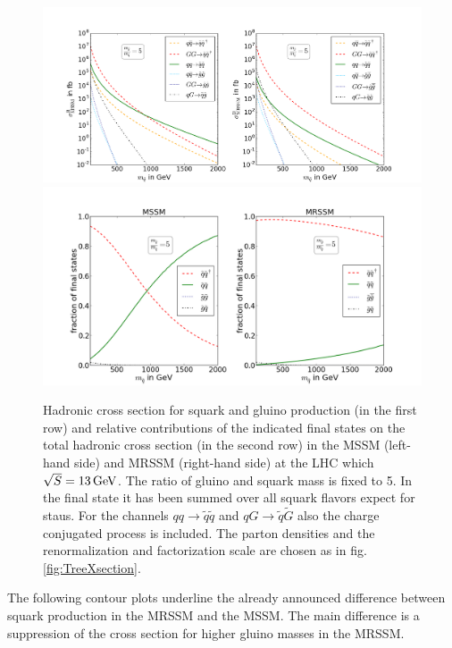 \begin{figure}[!htpb]
\begin{center}
\includegraphics[scale=.4]{figures/mr=5_MSSM+MRSSM}
\includegraphics[scale=.45]{figures/rel_weights_mr=5_MSSM+MRSSM}
\caption{Hadronic cross section for squark and gluino production (in the first row) and relative contributions of the indicated final states on the total hadronic cross section (in the second row) in the MSSM (left-hand side) and MRSSM (right-hand side) at the LHC which $\sqrt{S} = \unit[13]{GeV}$. The ratio of gluino and squark mass is fixed to 5. In the final state it has been summed over all squark flavors expect for staus. For the channels $qq \to \tilde{q}\tilde{q}$ and $qG \to \tilde{q}\tilde{G}$ also the charge conjugated process is included. The parton densities and the renormalization and factorization scale are chosen as in fig. \ref{fig:TreeXsection}.}\label{fig:TreeXsection5}
\end{center}
\end{figure}
The following contour plots underline the already announced difference between squark production in the MRSSM and the MSSM. The main difference is a suppression of the cross section for higher gluino masses in the MRSSM.
